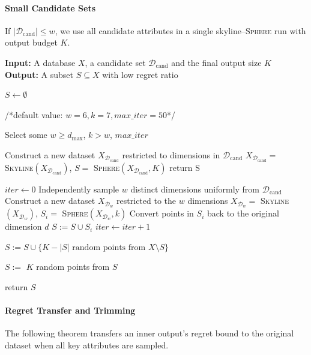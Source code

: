 \documentclass[conference]{IEEEtran}
\theoremstyle{definition}
\theoremstyle{plain}
\begin{document}
\paragraph{\textbf{Small Candidate Sets}}
If $\lvert\mathcal{D}_\text{cand}\rvert\leq w$, we use all candidate attributes in a single skyline--\textsc{Sphere} run with output budget $K$.

\begin{algorithm}[!t]
\caption{\textsc{AttributeSubset}}
\label{alg:att}
\flushleft
\textbf{Input:} A database $X$, a candidate set $\mathcal{D}_\text{cand}$ and the final output size $K$ \\
\textbf{Output:} A subset $S\subseteq X$ with low regret ratio

\begin{algorithmic}[1]

\State $S \gets \emptyset$

\Statex /*default value: $w=6, k = 7, max\_iter = 50$*/

\State Select some $w \geq d_\text{max}$, $k>w$, $max\_iter$ 

    \State Construct a new dataset $X_{\mathcal{D}_\text{cand}}$ restricted to dimensions in $\mathcal{D}_\text{cand}$
    \State $X_{\mathcal{D}_\text{cand}} = $ \textsc{Skyline}$(X_{\mathcal{D}_\text{cand}})$, $S = $ \textsc{Sphere}$(X_{\mathcal{D}_\text{cand}}, K)$
    \State return S
\EndIf

\State $iter \gets 0$
    \State Independently sample $w$ distinct dimensions uniformly from $\mathcal{D}_\text{cand}$
    \State Construct a new dataset $X_{\mathcal{D}_w}$ restricted to the $w$ dimensions
    \State $X_{\mathcal{D}_w} = $ \textsc{Skyline}$(X_{\mathcal{D}_w})$, $S_i = $ \textsc{Sphere}$(X_{\mathcal{D}_w}, k)$
    \State Convert points in $S_i$ back to the original dimension $d$
    \State $S := S \cup S_i$
    \State $iter \gets iter+1$
\EndWhile

    \State $S := S \cup \{\text{$K-|S|$ random points from $X\setminus S$} \}$
\EndIf

    \State $S := $ $K$ random points from $S$
\EndIf

\State return $S$
\end{algorithmic}
\end{algorithm}

\paragraph{\textbf{Regret Transfer and Trimming}}
The following theorem transfers an inner output's regret bound to the original dataset when all key attributes are sampled.
\end{document}
